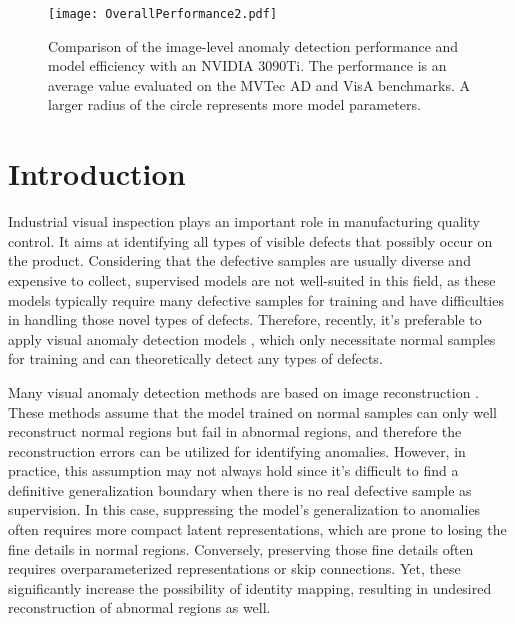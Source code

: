 \documentclass[5p, twocolumn]{elsarticle}[draft]
\begin{document}
\begin{figure}[h]
    \centering
		\texttt{[image: OverallPerformance2.pdf]}
	\caption{Comparison of the image-level anomaly detection performance and model efficiency with an NVIDIA 3090Ti. The performance is an average value evaluated on the MVTec AD \cite{bergmann2019mvtec} and VisA \cite{zou2022spot} benchmarks. A larger radius of the circle represents more model parameters.}
	\label{AbstractPerformance}
\end{figure}
\section{Introduction}
\label{}
Industrial visual inspection plays an important role in manufacturing quality control. It aims at identifying all types of visible defects that possibly occur on the product. Considering that the defective samples are usually diverse and expensive to collect, supervised models are not well-suited in this field, as these models typically require many defective samples for training and have difficulties in handling those novel types of defects. Therefore, recently, it's preferable to apply visual anomaly detection models \cite{diers2023survey,liu2023deep,horwitz2023back,wang2023multimodal}, which only necessitate normal samples for training and can theoretically detect any types of defects.

Many visual anomaly detection methods are based on image reconstruction \cite{bergmann2018improving,hou2021divide,collin2021improved,zavrtanik2021draem,zavrtanik2022dsr}. These methods assume that the model trained on normal samples can only well reconstruct normal regions but fail in abnormal regions, and therefore the reconstruction errors can be utilized for identifying anomalies. However, in practice, this assumption may not always hold since it's difficult to find a definitive generalization boundary when there is no real defective sample as supervision. In this case, suppressing the model's generalization to anomalies often requires more compact latent representations, which are prone to losing the fine details in normal regions. Conversely, preserving those fine details often requires overparameterized representations or skip connections. Yet, these significantly increase the possibility of identity mapping, resulting in undesired reconstruction of abnormal regions as well.
\end{document}
